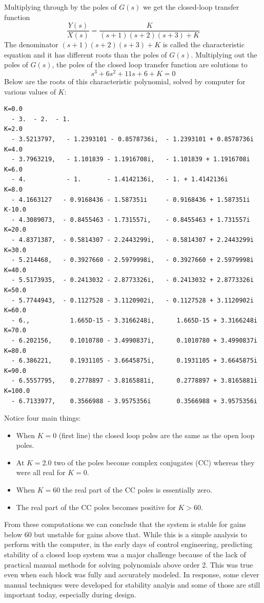 \noindent
Multiplying through by the poles of $G(s)$ we get the closed-loop transfer function
\[
\frac{Y(s)}{X(s)}= \frac {K}  {(s+1)(s+2)(s+3) + K}
\]
The denominator $(s+1)(s+2)(s+3) + K$ is called the characteristic equation and it has different roots than the poles of $G(s)$.   Multiplying out the poles of $G(s)$,  the poles of the closed loop transfer function
are solutions to
\[
s^3+6s^2+11s+6 +K = 0
\]
Below are the roots of this characteristic polynomial, solved by computer for various values of $K$:

\begin{verbatim}
K=0.0
  - 3.  - 2.  - 1.
K=2.0
  - 3.5213797,   - 1.2393101 - 0.8578736i,  - 1.2393101 + 0.8578736i
K=4.0
  - 3.7963219,   - 1.101839 - 1.1916708i,   - 1.101839 + 1.1916708i
K=6.0
  - 4.           - 1.       - 1.4142136i,   - 1. + 1.4142136i
K=8.0
  - 4.1663127   - 0.9168436 - 1.587351i     - 0.9168436 + 1.587351i
K-10.0
  - 4.3089073,  - 0.8455463 - 1.731557i,    - 0.8455463 + 1.731557i
K=20.0
  - 4.8371387,  - 0.5814307 - 2.2443299i,   - 0.5814307 + 2.2443299i
K=30.0
  - 5.214468,   - 0.3927660 - 2.5979998i,   - 0.3927660 + 2.5979998i
K=40.0
  - 5.5173935,  - 0.2413032 - 2.8773326i,   - 0.2413032 + 2.8773326i
K=50.0
  - 5.7744943,  - 0.1127528 - 3.1120902i,   - 0.1127528 + 3.1120902i
K=60.0
  - 6.,           1.665D-15 - 3.3166248i,      1.665D-15 + 3.3166248i
K=70.0
  - 6.202156,     0.1010780 - 3.4990837i,      0.1010780 + 3.4990837i
K=80.0
  - 6.386221,     0.1931105 - 3.6645875i,      0.1931105 + 3.6645875i
K=90.0
  - 6.5557795,    0.2778897 - 3.8165881i,      0.2778897 + 3.8165881i
K=100.0
  - 6.7133977,    0.3566988 - 3.9575356i       0.3566988 + 3.9575356i

\end{verbatim}

Notice four main things:

\begin{itemize}
  \item When $K=0$ (first line) the closed loop poles are the same as the open loop poles.
  \item At $K=2.0$ two of the poles become complex conjugates (CC) whereas they were all real for $K=0$.
  \item When $K=60$ the real part of the CC poles is essentially zero.
  \item The real part of the CC poles becomes positive for $K>60$.
\end{itemize}


 From these computations we can conclude that the system is stable for gains below 60 but unstable for gains above that.  While this is a simple analysis to perform with the computer, in the early days of control engineering,  predicting stability of a closed loop system
 was a major challenge because of the lack of practical manual methods for solving polynomials above order 2.
 This was true even when each block was fully and accurately modeled.
 In response, some clever manual  techniques were developed for stability analyis and some of those are still important today, especially during design.



